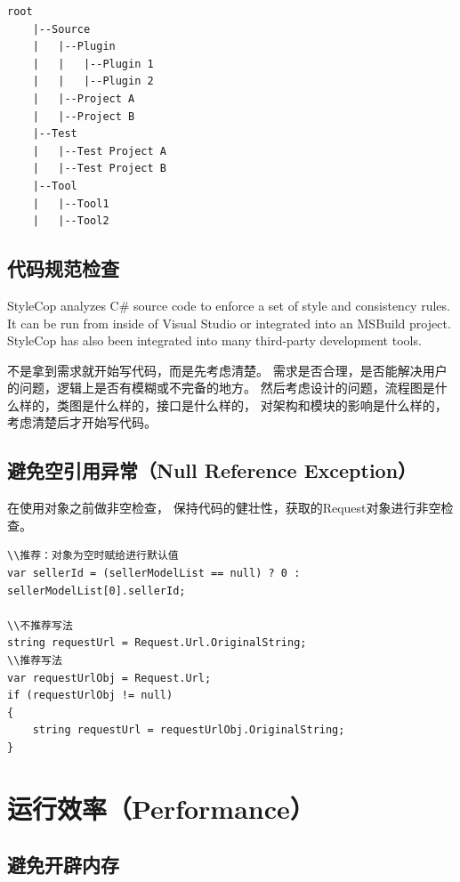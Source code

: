 \documentclass{book}
\begin{document}
\begin{lstlisting}
root
	|--Source
	|	|--Plugin
	|	|	|--Plugin 1
	|	|	|--Plugin 2
	|	|--Project A
	|	|--Project B
	|--Test
	|	|--Test Project A
	|	|--Test Project B
	|--Tool
	|	|--Tool1
	|	|--Tool2	
\end{lstlisting}


\subsection{代码规范检查}

StyleCop analyzes C\# source code to enforce a set of style and consistency rules. It can be run from inside of Visual Studio or integrated into an MSBuild project. StyleCop has also been integrated into many third-party development tools.

不是拿到需求就开始写代码，而是先考虑清楚。 
需求是否合理，是否能解决用户的问题，逻辑上是否有模糊或不完备的地方。 
然后考虑设计的问题，流程图是什么样的，类图是什么样的，接口是什么样的，
对架构和模块的影响是什么样的，考虑清楚后才开始写代码。

\subsection{避免空引用异常（Null Reference Exception）}

在使用对象之前做非空检查，
保持代码的健壮性，获取的Request对象进行非空检查。

\begin{lstlisting}[language={[Sharp]C}]
\\推荐：对象为空时赋给进行默认值
var sellerId = (sellerModelList == null) ? 0 : sellerModelList[0].sellerId;

\\不推荐写法
string requestUrl = Request.Url.OriginalString;
\\推荐写法
var requestUrlObj = Request.Url;
if (requestUrlObj != null)
{
    string requestUrl = requestUrlObj.OriginalString;
}
\end{lstlisting}

\section{运行效率（Performance）}

\subsection{避免开辟内存}
\end{document}
